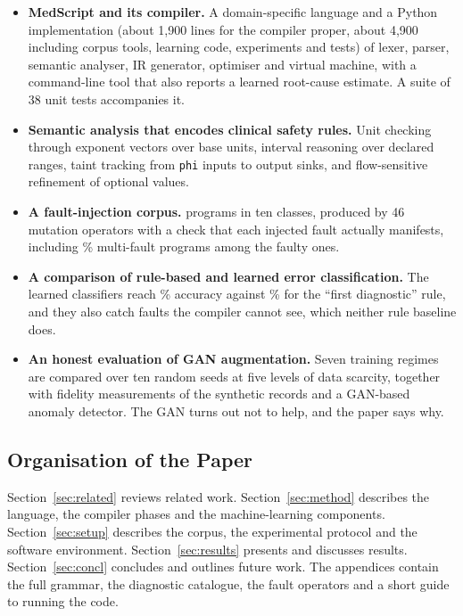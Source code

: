 \documentclass[conference]{IEEEtran}
\newcommand{\code}[1]{\texttt{#1}}
\begin{document}
\begin{itemize}
    \item \textbf{MedScript and its compiler.} A domain-specific language and a Python implementation (about
    1{,}900 lines for the compiler proper, about 4{,}900 including corpus tools, learning code, experiments and tests)
    of lexer, parser, semantic analyser, IR generator, optimiser and virtual machine, with a command-line tool that also reports a learned root-cause estimate. A suite of 38 unit tests accompanies it.
    \item \textbf{Semantic analysis that encodes clinical safety rules.} Unit checking through exponent vectors
    over base units, interval reasoning over declared ranges, taint tracking from \code{phi} inputs to output
    sinks, and flow-sensitive refinement of optional values.
    \item \textbf{A fault-injection corpus.} \NProg{} programs in ten classes, produced by 46 mutation operators
    with a check that each injected fault actually manifests, including \DoubleShare\% multi-fault programs among
    the faulty ones.
    \item \textbf{A comparison of rule-based and learned error classification.} The learned classifiers reach
    \RFAcc\% accuracy against \RuleFirstAcc\% for the ``first diagnostic'' rule, and they also catch faults the
    compiler cannot see, which neither rule baseline does.
    \item \textbf{An honest evaluation of GAN augmentation.} Seven training regimes are compared over ten
    random seeds at five levels of data scarcity, together with fidelity measurements of the synthetic records
    and a GAN-based anomaly detector. The GAN turns out not to help, and the paper says why.
\end{itemize}

\subsection{Organisation of the Paper}

Section~\ref{sec:related} reviews related work. Section~\ref{sec:method} describes the language, the compiler phases and the machine-learning
components. Section~\ref{sec:setup} describes the corpus, the experimental protocol and the software environment. Section~\ref{sec:results}
presents and discusses results. Section~\ref{sec:concl} concludes and outlines future work. The appendices contain the full
grammar, the diagnostic catalogue, the fault operators and a short guide to running the code.
\end{document}
